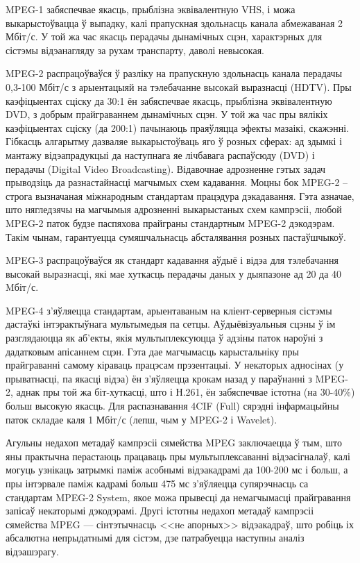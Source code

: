 MPEG-1 забяспечвае якасць, прыблізна эквівалентную VHS, і можа выкарыстоўвацца ў выпадку, калі прапускная здольнасць канала абмежаваная 2 Мбіт/с. У той жа час якасць перадачы дынамічных сцэн, характэрных для сістэмы відэанагляду за рухам транспарту, даволі невысокая.

MPEG-2 распрацоўваўся ў разліку на прапускную здольнасць канала перадачы 0,3-100 Мбіт/с з арыентацыяй на тэлебачанне высокай выразнасці (HDTV). Пры каэфіцыентах сціску да 30:1 ён забяспечвае якасць, прыблізна эквівалентную DVD, з добрым прайграваннем дынамічных сцэн. У той жа час пры вялікіх каэфіцыентах сціску (да 200:1) пачынаюць праяўляцца эфекты мазаікі, скажэнні. Гібкасць алгарытму дазваляе выкарыстоўваць яго ў розных сферах: ад здымкі і мантажу відэапрадукцыі да наступнага яе лічбавага распаўсюду (DVD) і перадачы (Digital Video Broadcasting). Відавочнае адрозненне гэтых задач прыводзіць да разнастайнасці магчымых схем кадавання. Моцны бок MPEG-2 -- строга вызначаная міжнародным стандартам працэдура дэкадавання. Гэта азначае, што нягледзячы на магчымыя адрозненні выкарыстаных схем кампрэсіі, любой MPEG-2 паток будзе паспяхова прайграны стандартным MPEG-2 дэкодэрам. Такім чынам, гарантуецца сумяшчальнасць абсталявання розных пастаўшчыкоў.

MPEG-3 распрацоўваўся як стандарт кадавання аўдыё і відэа для тэлебачання высокай выразнасці, які мае хуткасць перадачы даных у дыяпазоне ад 20 да 40 Mбіт/с.

MPEG-4 з'яўляецца стандартам, арыентаваным на кліент-серверныя сістэмы дастаўкі інтэрактыўнага мультымедыя па сетцы. Аўдыёвізуальныя сцэны ў ім разглядаюцца як аб'екты, якія мультыплексуюцца ў адзіны паток нароўні з дадатковым апісаннем сцэн. Гэта дае магчымасць карыстальніку пры прайграванні самому кіраваць працэсам прэзентацыі. У некаторых адносінах (у прыватнасці, па якасці відэа) ён з'яўляецца крокам назад у параўнанні з MPEG-2, аднак пры той жа біт-хуткасці, што і Н.261, ён забяспечвае істотна (на 30-40\%) больш высокую якасць. Для распазнавання 4CIF (Full) сярэдні інфармацыйны паток складае каля 1 Мбіт/с (лепш, чым у MPEG-2 і Wavelet).

Агульны недахоп метадаў кампрэсіі сямейства MPEG заключаецца ў тым, што яны прак\-тыч\-на перастаюць працаваць пры мультыплексаванні відэасігналаў, калі могуць узнікаць затрымкі паміж асобнымі відэакадрамі да 100-200 мс і больш, а пры інтэрвале паміж кадрамі больш 475 мс з'яўляецца супярэчнасць са стандартам MPEG-2 System, якое можа прывесці да немагчымасці прайгравання запісаў некаторымі дэкодэрамі. Другі істотны недахоп метадаў кам\-прэ\-сіі сямейства MPEG --- сінтэтычнасць <<нe апорных>> відэакадраў, што робіць іх аб\-са\-лют\-на непрыдатнымі для сістэм, дзе патрабуецца наступны аналіз відэашэрагу.

